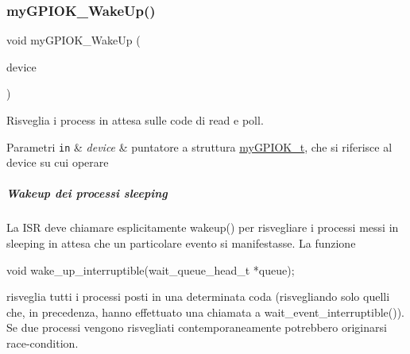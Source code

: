 \subsubsection{\texorpdfstring{my\+G\+P\+I\+O\+K\+\_\+\+Wake\+Up()}{myGPIOK\_WakeUp()}}
{\footnotesize\ttfamily void my\+G\+P\+I\+O\+K\+\_\+\+Wake\+Up (\begin{DoxyParamCaption}\item[{\hyperlink{structmy_g_p_i_o_k__t}{my\+G\+P\+I\+O\+K\+\_\+t} $\ast$}]{device }\end{DoxyParamCaption})}



Risveglia i process in attesa sulle code di read e poll. 


\begin{DoxyParams}[1]{Parametri}
\mbox{\tt in}  & {\em device} & puntatore a struttura \hyperlink{structmy_g_p_i_o_k__t}{my\+G\+P\+I\+O\+K\+\_\+t}, che si riferisce al device su cui operare\\
\hline
\end{DoxyParams}
\subparagraph*{Wakeup dei processi sleeping}

La I\+SR deve chiamare esplicitamente wakeup() per risvegliare i processi messi in sleeping in attesa che un particolare evento si manifestasse. La funzione 
\begin{DoxyCode}
\textcolor{keywordtype}{void} wake\_up\_interruptible(wait\_queue\_head\_t *queue);
\end{DoxyCode}
 risveglia tutti i processi posti in una determinata coda (risvegliando solo quelli che, in precedenza, hanno effettuato una chiamata a wait\+\_\+event\+\_\+interruptible()). Se due processi vengono risvegliati contemporaneamente potrebbero originarsi race-\/condition. 